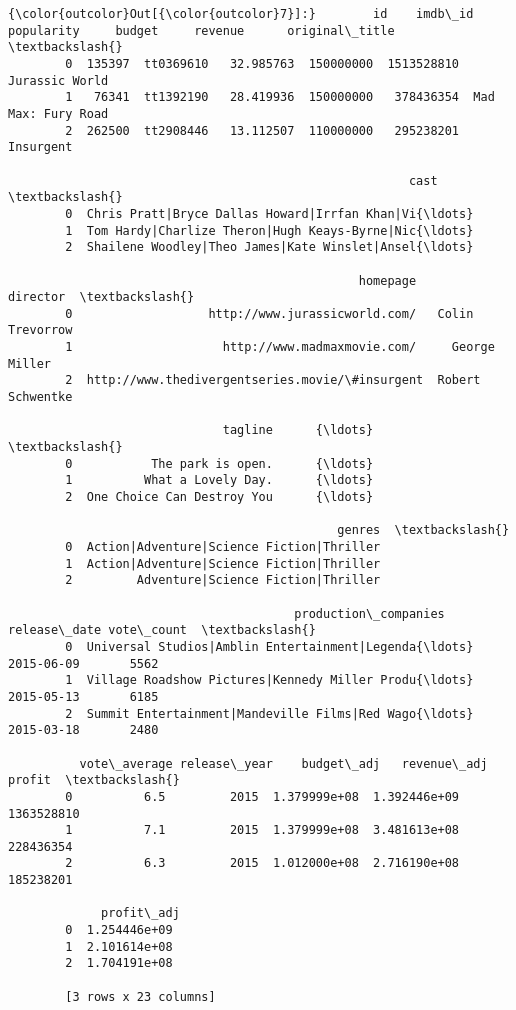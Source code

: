 \documentclass[11pt]{article}
\begin{document}
\begin{Verbatim}[commandchars=\\\{\}]
{\color{outcolor}Out[{\color{outcolor}7}]:}        id    imdb\_id  popularity     budget     revenue      original\_title  \textbackslash{}
        0  135397  tt0369610   32.985763  150000000  1513528810      Jurassic World   
        1   76341  tt1392190   28.419936  150000000   378436354  Mad Max: Fury Road   
        2  262500  tt2908446   13.112507  110000000   295238201           Insurgent   
        
                                                        cast  \textbackslash{}
        0  Chris Pratt|Bryce Dallas Howard|Irrfan Khan|Vi{\ldots}   
        1  Tom Hardy|Charlize Theron|Hugh Keays-Byrne|Nic{\ldots}   
        2  Shailene Woodley|Theo James|Kate Winslet|Ansel{\ldots}   
        
                                                 homepage          director  \textbackslash{}
        0                   http://www.jurassicworld.com/   Colin Trevorrow   
        1                     http://www.madmaxmovie.com/     George Miller   
        2  http://www.thedivergentseries.movie/\#insurgent  Robert Schwentke   
        
                              tagline      {\ldots}       \textbackslash{}
        0           The park is open.      {\ldots}        
        1          What a Lovely Day.      {\ldots}        
        2  One Choice Can Destroy You      {\ldots}        
        
                                              genres  \textbackslash{}
        0  Action|Adventure|Science Fiction|Thriller   
        1  Action|Adventure|Science Fiction|Thriller   
        2         Adventure|Science Fiction|Thriller   
        
                                        production\_companies  release\_date vote\_count  \textbackslash{}
        0  Universal Studios|Amblin Entertainment|Legenda{\ldots}    2015-06-09       5562   
        1  Village Roadshow Pictures|Kennedy Miller Produ{\ldots}    2015-05-13       6185   
        2  Summit Entertainment|Mandeville Films|Red Wago{\ldots}    2015-03-18       2480   
        
          vote\_average release\_year    budget\_adj   revenue\_adj      profit  \textbackslash{}
        0          6.5         2015  1.379999e+08  1.392446e+09  1363528810   
        1          7.1         2015  1.379999e+08  3.481613e+08   228436354   
        2          6.3         2015  1.012000e+08  2.716190e+08   185238201   
        
             profit\_adj  
        0  1.254446e+09  
        1  2.101614e+08  
        2  1.704191e+08  
        
        [3 rows x 23 columns]
\end{Verbatim}
            
\end{document}
